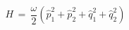 \begin{equation}
H \, = \, \frac{\omega}{2} \left({\hat p}_1^2 + {\hat p}_2^2 + 
{\hat q}_1^2 + {\hat q}_2^2\right)
\label{Hqp}
\end{equation}

